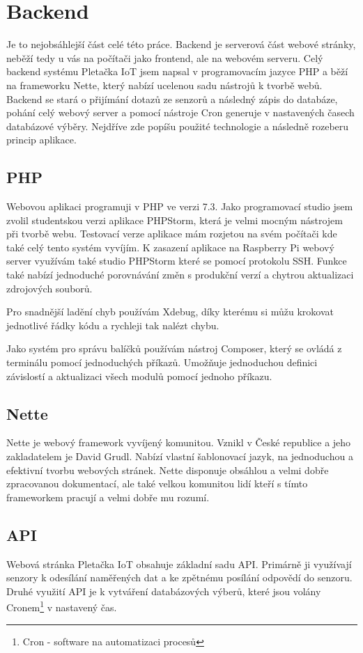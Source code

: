 \section{Backend}
Je to nejobsáhlejší část celé této práce. 
Backend je serverová část webové stránky, neběží tedy u vás na počítači jako frontend, ale na webovém serveru.   
Celý backend systému Pletačka IoT jsem napsal v programovacím jazyce PHP a běží na frameworku Nette\cite{NETTE}, který nabízí ucelenou sadu nástrojů k tvorbě webů.
Backend se stará o přijímání dotazů ze senzorů a následný zápis do databáze, pohání celý webový server a pomocí nástroje Cron generuje v nastavených časech databázové výběry.
Nejdříve zde popíšu použité technologie a následně rozeberu princip aplikace.

\subsection{PHP}
Webovou aplikaci programuji v PHP ve verzi 7.3. Jako programovací studio jsem zvolil studentskou verzi aplikace PHPStorm, která je velmi mocným nástrojem při tvorbě webu.
Testovací verze aplikace mám rozjetou na svém počítači kde také celý tento systém vyvíjím. K zasazení aplikace na Raspberry Pi webový server využívám také studio PHPStorm které se pomocí protokolu SSH. 
Funkce také nabízí jednoduché porovnávání změn s produkční verzí a chytrou aktualizaci zdrojových souborů.

Pro snadnější ladění chyb používám Xdebug, díky kterému si můžu krokovat jednotlivé řádky kódu a rychleji tak nalézt chybu.

Jako systém pro správu balíčků používám nástroj Composer, který se ovládá z terminálu pomocí jednoduchých příkazů.
Umožňuje jednoduchou definici závislostí a aktualizaci všech modulů pomocí jednoho příkazu.


\subsection{Nette}
Nette je webový framework vyvíjený komunitou. Vznikl v České republice a jeho zakladatelem je David Grudl. 
Nabízí vlastní šablonovací jazyk, na jednoduchou a efektivní tvorbu webových stránek. 
Nette disponuje obsáhlou a velmi dobře zpracovanou dokumentací, ale také velkou komunitou lidí kteří s tímto frameworkem pracují a velmi dobře mu rozumí. 


\subsection{API}
Webová stránka Pletačka IoT obsahuje základní sadu API.
Primárně ji využívají senzory k odesílání naměřených dat a ke zpětnému posílání odpovědí do senzoru.
Druhé využití API je k vytváření databázových výberů, které jsou volány Cronem\footnote{Cron - software na automatizaci procesů} v nastavený čas. 


